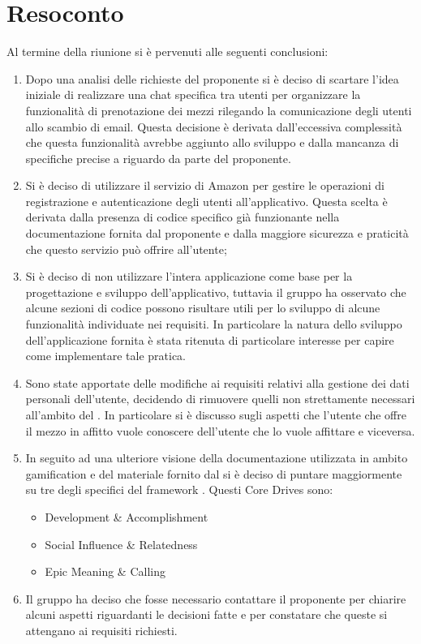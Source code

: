 \documentclass[a4paper, 12pt]{article}
\begin{document}
\section{Resoconto}
Al termine della riunione si è pervenuti alle seguenti conclusioni:	
\begin{enumerate}
	\item Dopo una analisi delle richieste del proponente si è deciso di scartare l'idea iniziale di realizzare una chat specifica tra utenti per organizzare la funzionalità di prenotazione dei mezzi rilegando la comunicazione degli utenti allo scambio di email. Questa decisione è derivata dall'eccessiva complessità che questa funzionalità avrebbe aggiunto allo sviluppo e dalla mancanza di specifiche precise a riguardo da parte del proponente.
	\item Si è deciso di utilizzare il servizio di Amazon  per gestire le operazioni di registrazione e autenticazione degli utenti all'applicativo. Questa scelta è derivata dalla presenza di codice specifico già funzionante nella documentazione fornita dal proponente e dalla maggiore sicurezza e praticità che questo servizio può offrire all'utente;
    \item Si è deciso di non utilizzare l'intera applicazione come base per la progettazione e sviluppo dell'applicativo, tuttavia il gruppo ha osservato che alcune sezioni di codice possono risultare utili per lo sviluppo di alcune funzionalità individuate nei requisiti. In particolare la natura  dello sviluppo dell'applicazione fornita è stata ritenuta di particolare interesse per capire come implementare tale pratica.
    \item Sono state apportate delle modifiche ai requisiti relativi alla gestione dei dati personali dell'utente, decidendo di rimuovere quelli non strettamente necessari all'ambito del . In particolare si è discusso sugli aspetti che l'utente che offre il mezzo in affitto vuole conoscere dell'utente che lo vuole affittare e viceversa.
    \item In seguito ad una ulteriore visione della documentazione utilizzata in ambito gamification e del materiale fornito dal  si è deciso di puntare maggiormente su tre degli specifici  del framework . Questi Core Drives sono:
    \begin{itemize}
        \item Development \& Accomplishment
        \item Social Influence \& Relatedness
        \item Epic Meaning \& Calling
    \end{itemize}
	\item Il gruppo ha deciso che fosse necessario contattare il proponente per chiarire alcuni aspetti riguardanti le decisioni fatte e per constatare che queste si attengano ai requisiti richiesti.
\end{enumerate}
\newpage
\end{document}
